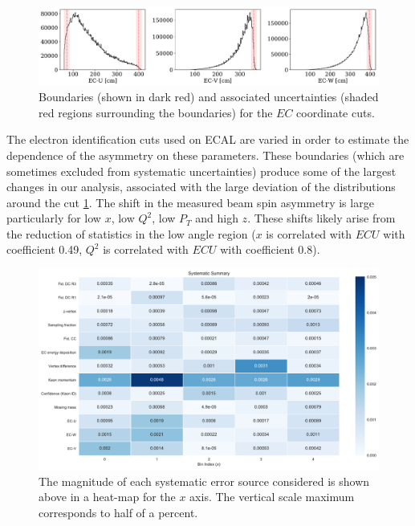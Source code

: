 \begin{figure}
	\label{fig:ec_fid_sys}
	\begin{center}
		\includegraphics[width=\textwidth]{image/plots/kaon-bsa/ec-fid-sys.pdf}
		\caption{Boundaries (shown in dark red) and associated uncertainties (shaded red regions surrounding the boundaries) for the $EC$ coordinate cuts.}
	\end{center}
\end{figure}

The electron identification cuts used on ECAL are varied in order to estimate the dependence of the asymmetry on these parameters.  These boundaries (which are sometimes excluded from systematic uncertainties) produce some of the largest changes in our analysis, associated with the large deviation of the distributions around the cut \ref{fig:ec_fid_sys}.  The shift in the measured beam spin asymmetry is large particularly for low $x$, low $Q^2$, low $P_T$ and high $z$.  These shifts likely arise from the reduction of statistics in the low angle region ($x$ is correlated with $ECU$ with coefficient 0.49, $Q^2$ is correlated with $ECU$ with coefficient 0.8).   

\begin{figure}
	\label{fig:systematic_heatmap_x}
	\begin{center}
		\includegraphics[width=\textwidth]{image/plots/kaon-bsa/systematics_integrated_heatmap_x.pdf}
		\caption{The magnitude of each systematic error source considered is shown above in a heat-map for the $x$ axis.  The vertical scale maximum corresponds to half of a percent.}
	\end{center}
\end{figure}

